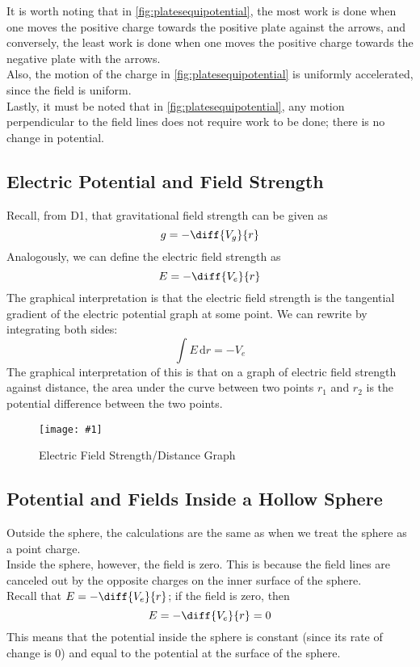 \documentclass[a4paper,12pt]{article}
\newcommand{\lb}{\\[8pt]}
\newcommand{\img}[4]{\begin{center}
  \begin{figure}[H]
    \centering
    \texttt{[image: \#1]}
    \caption{#3}
    \label{fig:#4}
  \end{figure}
\end{center}}
\begin{document}
It is worth noting that in \cref{fig:platesequipotential}, the most work is done when one moves the positive charge towards the positive plate against the arrows, and conversely, the least work is done when one moves the positive charge towards the negative plate with the arrows.\lb
Also, the motion of the charge in \cref{fig:platesequipotential} is uniformly accelerated, since the field is uniform.\lb
Lastly, it must be noted that in \cref{fig:platesequipotential}, any motion perpendicular to the field lines does not require work to be done; there is no change in potential.

\pagebreak

\subsection{Electric Potential and Field Strength}
Recall, from D1, that gravitational field strength can be given as
$$g = -\diff{V_g}{r}$$
Analogously, we can define the electric field strength as
\begin{equation}\label{eq:potential2}
  E = -\diff{V_e}{r}
\end{equation}
The graphical interpretation is that the electric field strength is the tangential gradient of the electric potential graph at some point.
We can rewrite by integrating both sides:
$$
  \int E\,\mathrm{d}r = -V_e
$$
The graphical interpretation of this is that on a graph of electric field strength against distance, the area under the curve between two points $r_1$ and $r_2$ is the potential difference between the two points.
\img{Ergraph.png}{0.5}{Electric Field Strength/Distance Graph}{Ergraph}

\pagebreak

\subsection{Potential and Fields Inside a Hollow Sphere}

Outside the sphere, the calculations are the same as when we treat the sphere as a point charge.\lb
Inside the sphere, however, the field is zero. This is because the field lines are canceled out by the opposite charges on the inner surface of the sphere.\lb
Recall that $E = -\diff{V_e}{r}$; if the field is zero, then $$E = -\diff{V_e}{r} = 0$$
This means that the potential inside the sphere is constant (since its rate of change is 0) and equal to the potential at the surface of the sphere.

\pagebreak
\end{document}
